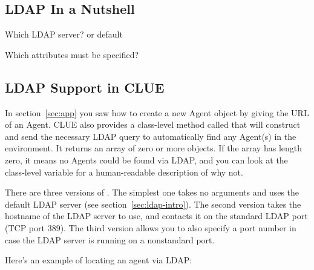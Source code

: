 \subsection{LDAP In a Nutshell}

Which LDAP server? or default

Which attributes must be specified?


\subsection{LDAP Support in CLUE}
\label{sec:ldap-clue}

In section~\ref{sec:app} you saw how to create a new \mtc{} Agent object
by giving the URL of an Agent.  CLUE also provides a class-level method
called  that will construct and send the necessary
LDAP query to automatically find any Agent(s) in the environment.  It
returns an array of zero or more  objects.  If the
array has length zero, it means no Agents could be found via LDAP, and
you can look at the class-level variable  for a
human-readable description of why not.

There are three versions of .  The simplest one takes
no arguments and uses the default LDAP server (see
section~\ref{sec:ldap-intro}).  The second version takes the hostname of
the LDAP server to use, and contacts it on the standard LDAP port (TCP
port 389).  The third version allows you to also specify a port number
in case the LDAP server is running on a nonstandard port.

Here's an example of locating an agent via LDAP:





